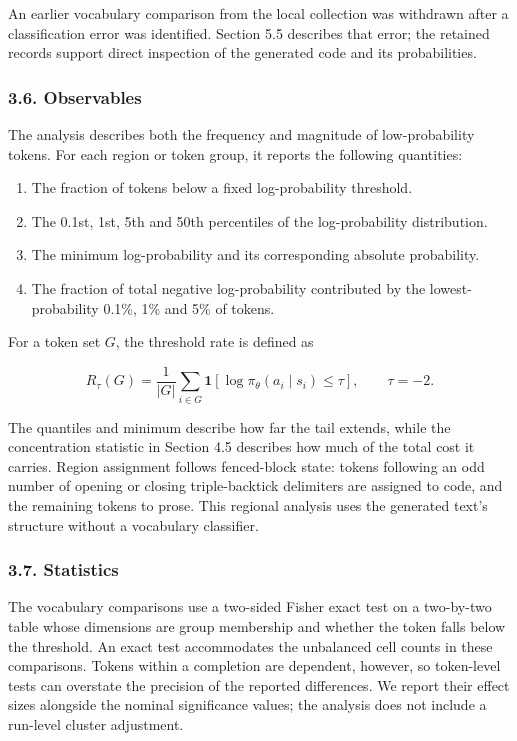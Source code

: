 \documentclass[
  11pt,
]{article}
\providecommand{\tightlist}{%
  \setlength{\itemsep}{0pt}\setlength{\parskip}{0pt}}
\begin{document}
An earlier vocabulary comparison from the local collection was withdrawn
after a classification error was identified. Section 5.5 describes that
error; the retained records support direct inspection of the generated
code and its probabilities.

\hypertarget{observables}{%
\subsubsection{3.6. Observables}\label{observables}}

The analysis describes both the frequency and magnitude of
low-probability tokens. For each region or token group, it reports the
following quantities:

\begin{enumerate}
\def\labelenumi{\arabic{enumi}.}
\tightlist
\item
  The fraction of tokens below a fixed log-probability threshold.
\item
  The 0.1st, 1st, 5th and 50th percentiles of the log-probability
  distribution.
\item
  The minimum log-probability and its corresponding absolute
  probability.
\item
  The fraction of total negative log-probability contributed by the
  lowest-probability 0.1\%, 1\% and 5\% of tokens.
\end{enumerate}

For a token set \(G\), the threshold rate is defined as

\[
R_\tau(G)=\frac{1}{|G|}\sum_{i\in G}\mathbf{1}\!\left[
\log\pi_\theta(a_i\mid s_i)\leq\tau\right],
\qquad\tau=-2.
\]

The quantiles and minimum describe how far the tail extends, while the
concentration statistic in Section 4.5 describes how much of the total
cost it carries. Region assignment follows fenced-block state: tokens
following an odd number of opening or closing triple-backtick delimiters
are assigned to code, and the remaining tokens to prose. This regional
analysis uses the generated text's structure without a vocabulary
classifier.

\hypertarget{statistics}{%
\subsubsection{3.7. Statistics}\label{statistics}}

The vocabulary comparisons use a two-sided Fisher exact test on a
two-by-two table whose dimensions are group membership and whether the
token falls below the threshold. An exact test accommodates the
unbalanced cell counts in these comparisons. Tokens within a completion
are dependent, however, so token-level tests can overstate the precision
of the reported differences. We report their effect sizes alongside the
nominal significance values; the analysis does not include a run-level
cluster adjustment.
\end{document}
